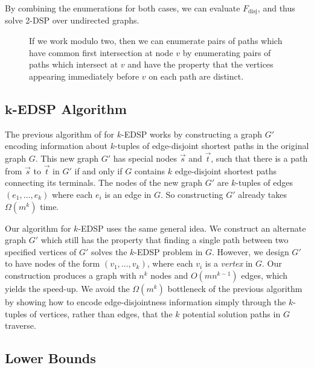 \documentclass[11pt]{article}
\DeclareMathOperator{\disj}{disj}
\theoremstyle{definition}
\begin{document}
By combining the enumerations for both cases, we can evaluate $F_{\disj}$, and thus solve \textsf{2-DSP} over undirected graphs.



\begin{figure}[t]
    \centering
    
    \caption{
    If we work modulo two, then we can enumerate pairs of paths which have common first intersection at node $v$ by enumerating pairs of paths which intersect at $v$ and have the property that the vertices appearing immediately before $v$ on each path are distinct. }
    \label{fig:intersetion-relax}
\end{figure}



\subsection{\texorpdfstring{$\boldsymbol{k}$}{k}-EDSP Algorithm}

The previous algorithm of \cite[Proposition 10]{BercziKobayashi2017} for \textsf{$k$-EDSP} works by constructing a graph $G'$ encoding information about $k$-tuples of edge-disjoint shortest paths in the original graph $G$.
This new graph $G'$ has special nodes $\vec{s}$ and $\vec{t}$, such that there is a path from $\vec{s}$ to $\vec{t}$ in $G'$ if and only if $G$ contains $k$ edge-disjoint shortest paths connecting its terminals.
The nodes of the new graph $G'$ are $k$-tuples of edges $(e_1, \dots, e_k)$ where each $e_i$ is an edge in $G$.
So constructing $G'$ already takes $\Omega(m^k)$ time.

Our algorithm for \textsf{$k$-EDSP} uses the same general idea.
We construct an alternate graph $G'$ which still has the property that finding a single path between two specified vertices of $G'$ solves the \textsf{$k$-EDSP} problem in $G$.
However, we design $G'$ to have nodes of the form $(v_1, \dots, v_k)$, where each $v_i$ is a \emph{vertex} in $G$.
Our construction produces a graph with $n^k$ nodes and $O(mn^{k-1})$ edges, which yields the speed-up. 
We avoid the $\Omega(m^k)$ bottleneck of the previous algorithm by showing how to encode edge-disjointness information simply through the $k$-tuples of vertices, rather than edges, that the $k$ potential solution paths in $G$ traverse.



\subsection{Lower Bounds}
\end{document}

